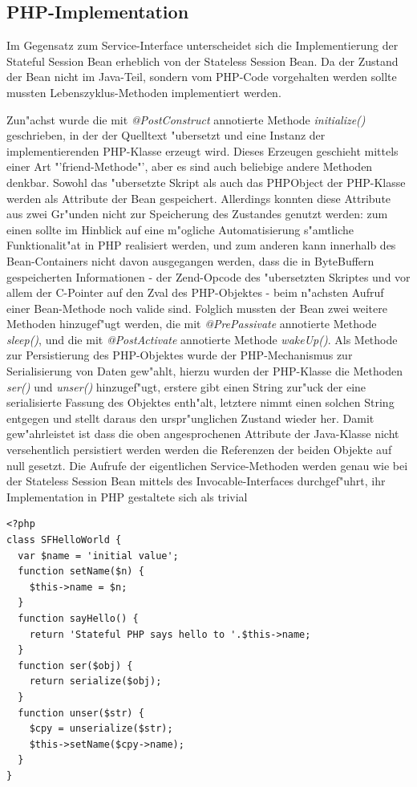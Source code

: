 \subsection{PHP-Implementation}
\label{sec:chap2:sfsb:impl}

Im Gegensatz zum Service-Interface unterscheidet sich die Implementierung der Stateful Session Bean erheblich von der
Stateless Session Bean. Da der Zustand der Bean nicht im Java-Teil, sondern vom PHP-Code vorgehalten werden sollte
mussten Lebenszyklus-Methoden implementiert werden.

Zun"achst wurde die mit \emph{@PostConstruct} annotierte Methode \emph{initialize()} geschrieben, in der der Quelltext
"ubersetzt und eine Instanz der implementierenden PHP-Klasse erzeugt wird. Dieses Erzeugen geschieht mittels einer
Art "'friend-Methode"', aber es sind auch beliebige andere Methoden denkbar.
Sowohl das "ubersetzte Skript als auch das PHPObject der PHP-Klasse werden als Attribute der Bean gespeichert. 
Allerdings konnten diese Attribute aus zwei
Gr"unden nicht zur Speicherung des Zustandes genutzt werden: zum einen sollte im Hinblick auf eine m"ogliche
Automatisierung s"amtliche Funktionalit"at in PHP realisiert werden, und zum anderen kann innerhalb des Bean-Containers
nicht davon ausgegangen werden, dass die in ByteBuffern gespeicherten Informationen - der Zend-Opcode des "ubersetzten
Skriptes und vor allem der C-Pointer auf den Zval des PHP-Objektes - beim n"achsten Aufruf einer Bean-Methode noch valide 
sind. Folglich mussten der Bean zwei weitere Methoden hinzugef"ugt werden, die mit \emph{@PrePassivate} annotierte Methode
\emph{sleep()}, und die mit \emph{@PostActivate} annotierte Methode \emph{wakeUp()}. Als Methode zur Persistierung des
PHP-Objektes wurde der PHP-Mechanismus zur Serialisierung von Daten gew"ahlt, hierzu wurden der PHP-Klasse die Methoden
\emph{ser()} und \emph{unser()} hinzugef"ugt, erstere gibt einen String zur"uck der eine serialisierte Fassung des Objektes
enth"alt, letztere nimmt einen solchen String entgegen und stellt daraus den urspr"unglichen Zustand wieder her.
Damit gew"ahrleistet ist dass die oben angesprochenen Attribute der Java-Klasse nicht versehentlich persistiert werden 
werden die Referenzen der beiden Objekte auf null gesetzt.
Die Aufrufe der eigentlichen Service-Methoden werden genau wie bei der Stateless Session Bean mittels des Invocable-Interfaces
durchgef"uhrt, ihr Implementation in PHP gestaltete sich als trivial
\begin{lstlisting}[caption=PHP-Implementierung]
<?php
class SFHelloWorld {
  var $name = 'initial value';
  function setName($n) {
    $this->name = $n;
  }
  function sayHello() {
    return 'Stateful PHP says hello to '.$this->name;
  }
  function ser($obj) {
    return serialize($obj);
  }
  function unser($str) {
    $cpy = unserialize($str);
    $this->setName($cpy->name);
  }
}
\end{lstlisting}


